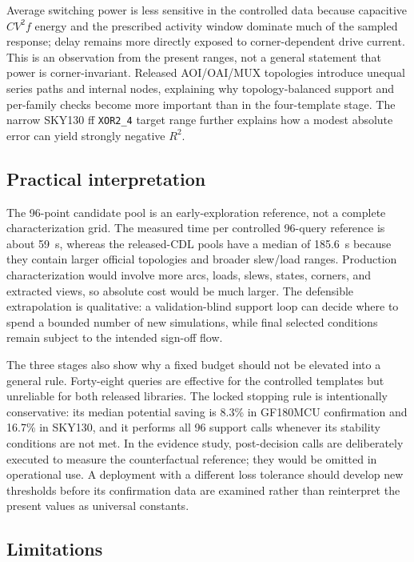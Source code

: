 \documentclass[preprint,12pt]{elsarticle}
\begin{document}
Average switching power is less sensitive in the controlled data because capacitive $CV^2f$ energy and the prescribed activity window dominate much of the sampled response; delay remains more directly exposed to corner-dependent drive current. This is an observation from the present ranges, not a general statement that power is corner-invariant. Released AOI/OAI/MUX topologies introduce unequal series paths and internal nodes, explaining why topology-balanced support and per-family checks become more important than in the four-template stage. The narrow SKY130 ff \texttt{XOR2\_4} target range further explains how a modest absolute error can yield strongly negative $R^2$.

\subsection{Practical interpretation}

The 96-point candidate pool is an early-exploration reference, not a complete characterization grid. The measured time per controlled 96-query reference is about 59~s, whereas the released-CDL pools have a median of 185.6~s because they contain larger official topologies and broader slew/load ranges. Production characterization would involve more arcs, loads, slews, states, corners, and extracted views, so absolute cost would be much larger. The defensible extrapolation is qualitative: a validation-blind support loop can decide where to spend a bounded number of new simulations, while final selected conditions remain subject to the intended sign-off flow.

The three stages also show why a fixed budget should not be elevated into a general rule. Forty-eight queries are effective for the controlled templates but unreliable for both released libraries. The locked stopping rule is intentionally conservative: its median potential saving is 8.3\% in GF180MCU confirmation and 16.7\% in SKY130, and it performs all 96 support calls whenever its stability conditions are not met. In the evidence study, post-decision calls are deliberately executed to measure the counterfactual reference; they would be omitted in operational use. A deployment with a different loss tolerance should develop new thresholds before its confirmation data are examined rather than reinterpret the present values as universal constants.

\subsection{Limitations}
\end{document}
